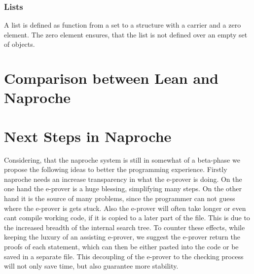 \documentclass[11pt]{article}
\begin{document}
\subsubsection{Lists}

A list is defined as function from a set to a structure with a carrier and a zero element. The zero element ensures, that the list is not defined over an empty set of objects. 

\section{Comparison between Lean and Naproche}


\section{Next Steps in Naproche}

Considering, that the naproche system is still in somewhat of a beta-phase we propose the following ideas to better the programming experience.
Firstly naproche needs an increase transparency in what the e-prover is doing. On the one hand the e-prover is a huge blessing, simplifying many steps. On the other hand it is the source of many problems, since the programmer can not guess where the e-prover is gets stuck. Also the e-prover will often take longer or even cant compile working code, if it is copied to a later part of the file. This is due to the increased breadth of the internal search tree. To counter these effects, while keeping the luxury of an assisting e-prover, we suggest the e-prover return the proofs of each statement, which can then be either pasted into the code or be saved in a separate file. This decoupling of the e-prover to the checking process will not only save time, but also guarantee more stability. 
\end{document}
